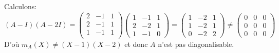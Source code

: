 \begin{eg}
\begin{enumerate}
\[            \] 
            Calculons:
            \[
                (A - I)(A - 2I) = \begin{pmatrix} 
                    2 & -1 & 1\\
                    2 & -1 & 1\\
                    1 & -1 & 1\\
                \end{pmatrix} 
                \begin{pmatrix} 
                    1 & -1 & 1\\
                    2 & -2 & 1\\
                    1 & -1 & 0
                \end{pmatrix} 
                =
            \begin{pmatrix}
            1 & -2 & 1 \\
            1 & -2 & 1 \\
            0 & -2 & 2
            \end{pmatrix} \neq \begin{pmatrix} 0 & 0 & 0\\  0 & 0 & 0\\ 0 & 0 & 0 \end{pmatrix} 
            \] 
            D'où $m_A(X) \neq (X-1)(X-2)$ et donc $A$ n'est pas diagonalisable.
   \end{enumerate} 
\end{eg}
